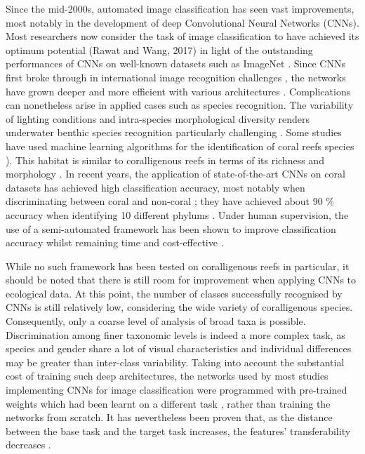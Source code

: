 Since the mid-2000s, automated image classification has seen vast improvements, most notably in the development of deep Convolutional Neural Networks (CNNs). Most researchers now consider the task of image classification to have achieved its optimum potential (Rawat and Wang, 2017) in light of the outstanding performances of CNNs on well-known datasets such as ImageNet \citep{deng_imagenet:_2009}. Since CNNs first broke through in international image recognition challenges \citep{krizhevsky_imagenet_2012}, the networks have grown deeper and more efficient with various architectures \citep{he_deep_2016, huang_densely_2017, szegedy_going_2015}. Complications can nonetheless arise in applied cases such as species recognition. The variability of lighting conditions and intra-species morphological diversity renders underwater benthic species recognition particularly challenging \citep{beijbom_automated_2012}. Some studies have used machine learning algorithms for the identification of coral reefs species \citep{beijbom_automated_2012, marcos_classification_2005}). This habitat is similar to coralligenous reefs in terms of its richness and morphology \citep{bianchi_biocostruzione_2001}. In recent years, the application of state-of-the-art CNNs on coral datasets has achieved high classification accuracy, most notably when discriminating between coral and non-coral \citep{manderson_robotic_2017, williams_leveraging_2019}; they have achieved about 90 \% accuracy when identifying 10 different phylums \citep{king_comparison_2018}. Under human supervision, the use of a semi-automated framework has been shown to improve classification accuracy whilst remaining time and cost-effective \citep{beijbom_towards_2015, geifman_selective_2017}.

While no such framework has been tested on coralligenous reefs in particular, it should be noted that there is still room for improvement when applying CNNs to ecological data. At this point, the number of classes successfully recognised by CNNs is still relatively low, considering the wide variety of coralligenous species. Consequently, only a coarse level of analysis of broad taxa is possible. Discrimination among finer taxonomic levels is indeed a more complex task, as species and gender share a lot of visual characteristics and individual differences may be greater than inter-class variability. Taking into account the substantial cost of training such deep architectures, the networks used by most studies implementing CNNs for image classification were programmed with pre-trained weights which had been learnt on a different task \citep{king_comparison_2018, mahmood_deep_2017}, rather than training the networks from scratch. It has nevertheless been proven that, as the distance between the base task and the target task increases, the features’ transferability decreases \citep{yosinski_how_2014}. 

